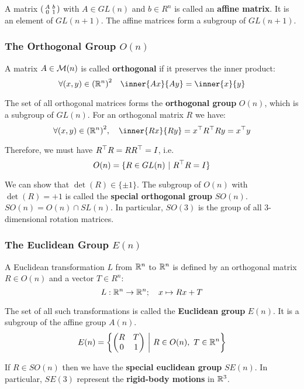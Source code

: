 A matrix $\left(\begin{smallmatrix} A & b \\ 0 & 1 \end{smallmatrix} \right)$ with $A \in GL(n)$ and $b \in R^n$
is called an \textbf{affine matrix}. It is an element of $GL(n+1)$.
The affine matrices form a subgroup of $GL(n+1)$.


\subsubsection{The Orthogonal Group $O(n)$}%
\label{ssub:the_orthogonal_group_o_n_}

A matrix $A \in \mathcal{M}(n)$ is called \textbf{orthogonal} if it preserves
the inner product:
\[\forall (x,y) \in {(\R^n)}^2 \quad \inner{Ax}{Ay} = \inner{x}{y}\]

The set of all orthogonal matrices forms the \textbf{orthogonal group}
$O(n)$, which is a subgroup of $GL(n)$.
For an orthogonal matrix $R$ we have:
\[\forall (x,y) \in {(\R^n)}^2, \quad
\inner{Rx}{Ry} = \tr{x}\tr{R}Ry = \tr{x}y\]

Therefore, we must have $R^{\top}R = RR^{\top} = I$, i.e.
\[O(n) = \{ R \in GL(n) \ | \ R^{\top}R = I \}\]

We can show that $\det(R) \in \{ \pm 1\}$.
The subgroup of $O(n)$ with $\det(R) = +1$ is called
the \textbf{special orthogonal group} $SO(n)$.
$SO(n) = O(n) \cap SL(n)$.
In particular, $SO(3)$ is the group of all 3-dimensional rotation matrices.


\subsubsection{The Euclidean Group $E(n)$}%
\label{ssub:the_euclidean_group_e_n_}

A Euclidean transformation $L$ from $\mathbb{R}^n$ to $\mathbb{R}^n$ is defined by
an orthogonal matrix $R \in O(n)$ and a vector $T \in R^n$:
\[L : \mathbb{R}^n \rightarrow \mathbb{R}^n; \quad x \mapsto Rx + T\]

The set of all such transformations is called the
\textbf{Euclidean group} $E(n)$. It is a subgroup of the affine group $A(n)$.
\[E(n) = \left\{
	\begin{pmatrix}
		R & T \\
		0 & 1 \\
	\end{pmatrix}
\ \middle| \ R \in O(n), \ T \in \mathbb{R}^n \right\}\]


If $R \in SO(n)$ then we have the \textbf{special euclidean group} $SE(n)$.
In particular, $SE(3)$ represent the \textbf{rigid-body motions} in $\mathbb{R}^3$.\\

